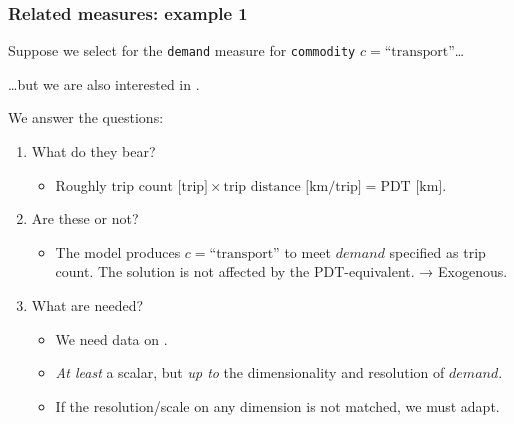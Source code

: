 \documentclass[12pt,aspectratio=169]{beamer}
\begin{document}
\begin{frame}
\frametitle{Related measures: example 1}

Suppose we select  for the \texttt{demand} measure for \texttt{commodity} $c=\text{“transport”}$…

\pause
…but we are also interested in .

\bigskip
We answer the questions:
\begin{enumerate}[<+(1)->]
  \item What  do they bear?
    \begin{itemize}
      \item Roughly $\text{trip count [trip]} \times \text{trip distance [km/trip]} = \text{PDT [km]}$.
    \end{itemize}
  \item Are these  or not?
    \begin{itemize}
      \item The model produces $c=\text{“transport”}$ to meet $demand$ specified as trip count. The solution is not affected by the PDT-equivalent. → Exogenous.
    \end{itemize}
  \item What  are needed?
    \begin{itemize}
      \item We need data on .
      \item \emph{At least} a scalar, but \emph{up to} the dimensionality and resolution of $demand$.
      \item If the resolution/scale on any dimension is not matched, we must adapt.
    \end{itemize}
\end{enumerate}
\end{frame}
\end{document}
